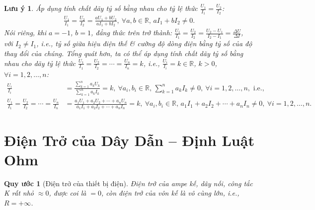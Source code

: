 \documentclass{article}
\newtheorem{luuy}{Lưu ý}
\newtheorem{quyuoc}{Quy ước}
\begin{document}
\begin{luuy}
	Áp dụng tính chất dãy tỷ số bằng nhau cho tỷ lệ thức $\frac{U_1}{I_1} = \frac{U_2}{I_2}$:
	\begin{align*}
		\frac{U_1}{I_1} = \frac{U_2}{I_2} = \frac{aU_1 + bU_2}{aI_1 + bI_2},\ \forall a,b\in\mathbb{R},\,aI_1 + bI_2\ne0.
	\end{align*}
	Nói riêng, khi $a = -1$, $b = 1$, đẳng thức trên trở thành: $\frac{U_1}{I_1} = \frac{U_2}{I_2} = \frac{U_2 - U_1}{I_2 - I_1} = \frac{\Delta U}{\Delta I}$, với $I_2\ne I_1$, i.e., tỷ số giữa hiệu điện thế \& cường độ dòng điện bằng tỷ số của độ thay đổi của chúng. Tổng quát hơn, ta có thể áp dụng tính chất dãy tỷ số bằng nhau cho dãy tỷ lệ thức $\frac{U_1}{I_1} = \frac{U_2}{I_2} = \cdots = \frac{U_n}{I_n} = k$, i.e., $\frac{U_i}{I_i} = k\in\mathbb{R}$, $k > 0$, $\forall i = 1,2,\ldots,n$:
	\begin{align*}
		\frac{U_i}{I_i} &= \frac{\sum_{k=1}^n a_kU_k}{\sum_{k=1}^n a_kI_k} = k,\ \forall a_i,b_i\in\mathbb{R},\,\sum_{k=1}^n a_kI_k\ne0,\ \forall i = 1,2,\ldots,n,\mbox{ i.e.,}\\		
		\frac{U_1}{I_1} = \frac{U_2}{I_2} = \cdots = \frac{U_n}{I_n} &= \frac{a_1U_1 + a_2U_2 + \cdots + a_nU_n}{a_1I_1 + a_2I_2 + \cdots + a_nI_n} = k,\ \forall a_i,b_i\in\mathbb{R},\,a_1I_1 + a_2I_2 + \cdots + a_nI_n\ne0,\ \forall i = 1,2,\ldots,n.
	\end{align*}
\end{luuy}


\section{Điện Trở của Dây Dẫn -- Định Luật Ohm}

\begin{quyuoc}[Điện trở của thiết bị điện]
	Điện trở của ampe kế, dây nối, công tắc K rất nhỏ $\approx0$, được coi là $= 0$, còn điện trở của vôn kế là vô cùng lớn, i.e., $R = +\infty$.
\end{quyuoc}
\end{document}
